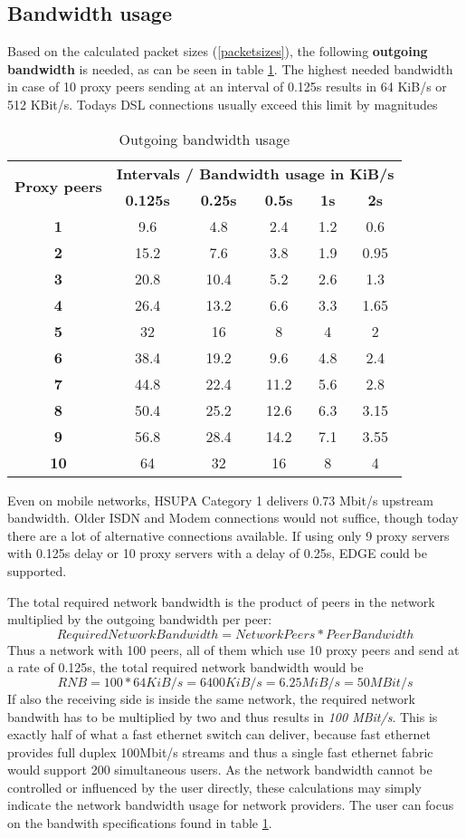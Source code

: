 \subsection{Bandwidth usage}
Based on the calculated packet sizes (\ref{packetsizes}), 
the following \textbf{outgoing bandwidth}
is needed, as can be seen in table \ref{bandwidth}.
The highest needed bandwidth
in case of 10 proxy peers sending at an interval of 0.125s results in 64 KiB/s
or 512 KBit/s. Todays DSL connections usually exceed this limit by magnitudes
\begin{longtable}{|c|c|c|c|c|c|}
\caption{Outgoing bandwidth usage}
\label{bandwidth}\\
\hline
\multirow{2}{*}{\textbf{Proxy peers}} & \multicolumn{5}{|l|}{\textbf{Intervals / Bandwidth usage in KiB/s}} \\
& \textbf{0.125s} & \textbf{0.25s} & \textbf{0.5s} & \textbf{1s} & \textbf{2s}\\
\hline
\textbf{1} & 9.6 & 4.8 & 2.4 & 1.2 & 0.6\\
\hline
\textbf{2} & 15.2 & 7.6 & 3.8 & 1.9 & 0.95\\
\hline
\textbf{3} & 20.8 & 10.4 & 5.2 & 2.6 & 1.3\\
\hline
\textbf{4} & 26.4 & 13.2 & 6.6 & 3.3 & 1.65\\
\hline
\textbf{5} & 32 & 16 & 8 & 4 & 2\\
\hline
\textbf{6} & 38.4 & 19.2 & 9.6 & 4.8 & 2.4\\
\hline
\textbf{7} & 44.8 & 22.4 & 11.2 & 5.6 & 2.8\\
\hline
\textbf{8} & 50.4 & 25.2 & 12.6 & 6.3 & 3.15\\
\hline
\textbf{9} & 56.8 & 28.4 & 14.2 & 7.1 & 3.55\\
\hline
\textbf{10} & 64 & 32 & 16 & 8 & 4\\
\hline
\end{longtable}
Even on mobile networks, HSUPA Category 1 delivers 0.73 Mbit/s upstream bandwidth.
Older ISDN and Modem connections would not suffice, though
today there are a lot of alternative connections available.\cite{wiki:bitrates}
If using only 9 proxy servers with 0.125s delay or
10 proxy servers with a delay of 0.25s, EDGE could be supported.

The total required network bandwidth is the product of peers in the
network multiplied by the outgoing bandwidth per peer:
$$Required Network Bandwidth = Network Peers * Peer Bandwidth$$
Thus a network with 100 peers, all of them which use 10 proxy peers
and send at a rate of 0.125s, the total required network bandwidth would be
$$RNB = 100 * 64 KiB/s = 6400 KiB/s = 6.25MiB/s = 50 MBit/s$$
If also the receiving side is inside the same network, the required network
bandwith has to be multiplied by two and thus results in 
\textit{100 MBit/s}. This is exactly half of what a fast ethernet switch
can deliver, because fast ethernet provides full duplex 100Mbit/s streams
and thus a single fast ethernet fabric would support 200 simultaneous users.
As the network bandwidth cannot be controlled or influenced by the user
directly, these calculations may simply indicate the network bandwidth
usage for network providers. The user can focus on the bandwith specifications
found in table \ref{bandwidth}.



